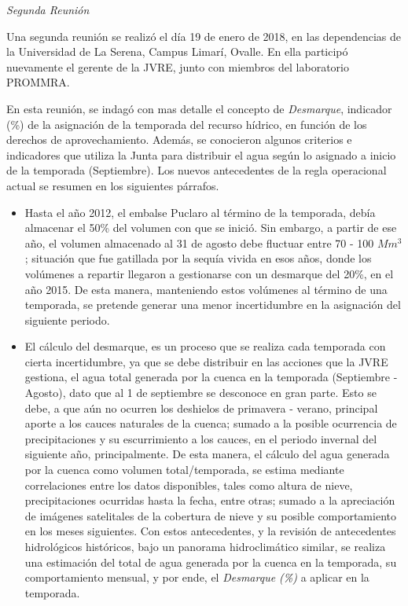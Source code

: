 \documentclass[11pt,]{article}
\begin{document}
		\textit {Segunda Reunión}\bigskip
		
		Una segunda reunión se realizó el día 19 de enero de 2018, en las dependencias de la Universidad de La Serena, Campus Limarí, Ovalle. En ella participó nuevamente el gerente de la JVRE, junto con miembros del laboratorio PROMMRA. \bigskip
		
		En esta reunión, se indagó con mas detalle el concepto de \textit {Desmarque}, indicador (\%) de la asignación de la temporada del recurso hídrico, en función de los derechos de aprovechamiento. Además, se conocieron algunos criterios e indicadores que utiliza la Junta para distribuir el agua según lo asignado a inicio de la temporada (Septiembre). Los nuevos antecedentes de la regla operacional actual se resumen en los siguientes párrafos.
		
		\begin{itemize}
		
		\item Hasta el año 2012, el embalse Puclaro al término de la temporada, debía almacenar el 50\% del volumen con que se inició. Sin embargo, a partir de ese año, el volumen almacenado al 31 de agosto debe fluctuar entre 70 - 100 $Mm^3$; situación que fue gatillada por la sequía vivida en esos años, donde los volúmenes a repartir llegaron a gestionarse con un desmarque del 20\%, en el año 2015. De esta manera, manteniendo estos volúmenes al término de una temporada, se pretende generar una menor incertidumbre en la asignación del siguiente periodo.
		
		\item El cálculo del desmarque, es un proceso que se realiza cada temporada con cierta incertidumbre, ya que se debe distribuir en las acciones que la JVRE gestiona, el agua total generada por la cuenca en la temporada (Septiembre - Agosto), dato que al 1 de septiembre se desconoce en gran parte. Esto se debe, a que aún no ocurren los deshielos de primavera - verano, principal aporte a los cauces naturales de la cuenca; sumado a la posible ocurrencia de precipitaciones y su escurrimiento a los cauces, en el periodo invernal del siguiente año, principalmente. De esta manera, el cálculo del agua generada por la cuenca como volumen total/temporada, se estima mediante correlaciones entre los datos disponibles, tales como altura de nieve, precipitaciones ocurridas hasta la fecha, entre otras; sumado a la apreciación de imágenes satelitales de la cobertura de nieve y su posible comportamiento en los meses siguientes. Con estos antecedentes, y la revisión de antecedentes hidrológicos históricos, bajo un panorama hidroclimático similar, se realiza una estimación del total de agua generada por la cuenca en la temporada, su comportamiento mensual, y por ende, el \textit {Desmarque (\%)} a aplicar en la temporada.
		

\end{itemize}
\end{document}
